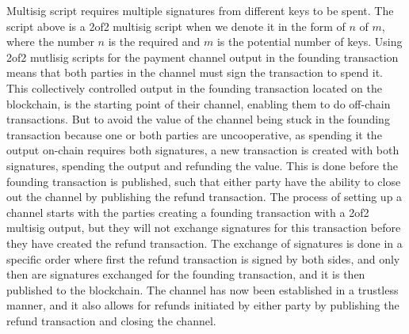 Multisig script requires multiple signatures from different keys to be spent. The script above is a 2of2 multisig script when we denote it in the form of $n$ of $m$, where the number $n$ is the required and $m$ is the potential number of keys. Using 2of2 mutlisig scripts for the payment channel output in the founding transaction means that both parties in the channel must sign the transaction to spend it. This collectively controlled output in the founding transaction located on the blockchain, is the starting point of their channel, enabling them to do off-chain transactions. But to avoid the value of the channel being stuck in the founding transaction because one or both parties are uncooperative, as spending it the output on-chain requires both signatures, a new transaction is created with both signatures, spending the output and refunding the value. This is done before the founding transaction is published, such that either party have the ability to close out the channel by publishing the refund transaction. The process of setting up a channel starts with the parties creating a founding transaction with a 2of2 multisig output, but they will not exchange signatures for this transaction before they have created the refund transaction. The exchange of signatures is done in a specific order where first the refund transaction is signed by both sides, and only then are signatures exchanged for the founding transaction, and it is then published to the blockchain. The channel has now been established in a trustless manner, and it also allows for refunds initiated by either party by publishing the refund transaction and closing the channel. 
\\


